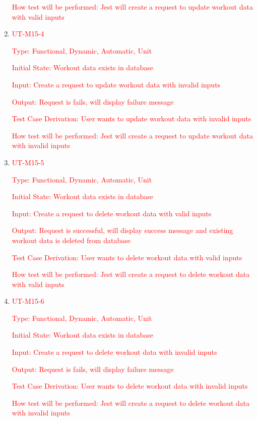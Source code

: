 \documentclass[12pt, titlepage]{article}
\begin{document}
\begin{enumerate}
	\textcolor{red}{How test will be performed: Jest will create a request to update workout data with valid inputs}

        \item{\textcolor{red}{UT-M15-4\\}}

	\textcolor{red}{Type: Functional, Dynamic, Automatic, Unit}

	\textcolor{red}{Initial State: Workout data exists in database}

	\textcolor{red}{Input: Create a request to update workout data with invalid inputs}

	\textcolor{red}{Output: Request is fails, will display failure message}

	\textcolor{red}{Test Case Derivation: User wants to update workout data with invalid inputs}

	\textcolor{red}{How test will be performed: Jest will create a request to update workout data with invalid inputs}

    \item{\textcolor{red}{UT-M15-5\\}}

	\textcolor{red}{Type: Functional, Dynamic, Automatic, Unit}

	\textcolor{red}{Initial State: Workout data exists in database}

	\textcolor{red}{Input: Create a request to delete workout data with valid inputs}

	\textcolor{red}{Output: Request is successful, will display success message and existing workout data is deleted from database}

	\textcolor{red}{Test Case Derivation: User wants to delete workout data with valid inputs}

 \textcolor{red}{How test will be performed: Jest will create a request to delete workout data with valid inputs}

         \item{\textcolor{red}{UT-M15-6\\}}

	\textcolor{red}{Type: Functional, Dynamic, Automatic, Unit}

	\textcolor{red}{Initial State: Workout data exists in database}

	\textcolor{red}{Input: Create a request to delete workout data with invalid inputs}

	\textcolor{red}{Output: Request is fails, will display failure message}

	\textcolor{red}{Test Case Derivation: User wants to delete workout data with invalid inputs}

	\textcolor{red}{How test will be performed: Jest will create a request to delete workout data with invalid inputs}

\end{enumerate}
\end{document}
